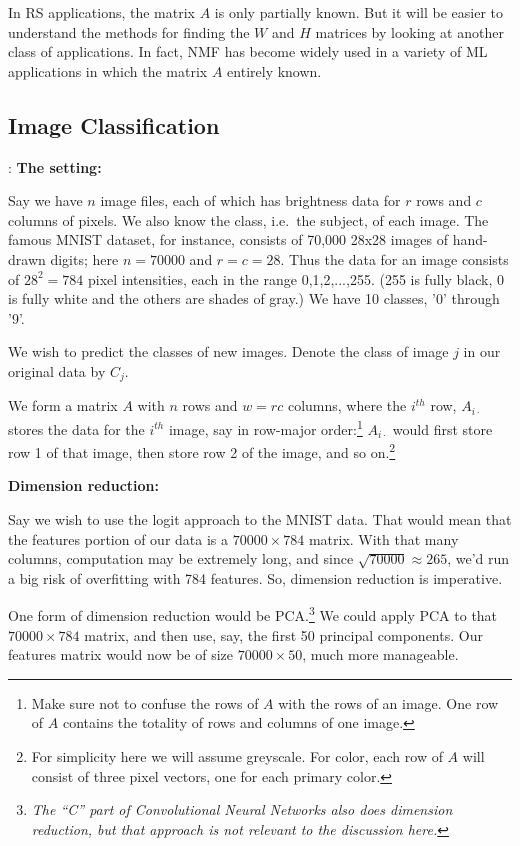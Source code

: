 In RS applications, the matrix $A$ is only partially known.  But it will
be easier to understand the methods for finding the $W$ and $H$ matrices
by looking at another class of applications.  In fact, NMF has become
widely used in a variety of ML applications in which the matrix $A$
entirely known. 

\subsection{Image Classification}
:
\textbf{The setting:}

Say we have $n$ image files, each of which has brightness data for $r$
rows and $c$ columns of pixels.  We also know the class, i.e.\ the
subject, of each image.  The famous MNIST dataset, for instance,
consists of 70,000 28x28 images of hand-drawn digits; here $n = 70000$
and $r = c = 28$.  Thus the data for an image consists of $28^2 = 784$
pixel intensities, each in the range 0,1,2,...,255.  (255 is fully
black, 0 is fully white and the others are shades of gray.) We have 10
classes, '0' through '9'.

We wish to predict the classes of new images. Denote the class of
image $j$ in our original data by $C_j$.

We form a matrix $A$ with $n$ rows and $w = rc$ columns, where the
$i^{th}$ row, $A_{i \cdot}$ stores the data for the $i^{th}$ image, say
in row-major order:\footnote{Make sure not to confuse the rows of $A$
with the rows of an image.  One row of $A$ contains the totality of rows
and columns of one image.} $A_{i \cdot}$ would first store row 1 of
that image, then store row 2 of the image, and so on.\footnote{For
simplicity here we will assume greyscale.  For color, each row of $A$
will consist of three pixel vectors, one for each primary color.}

\textbf{Dimension reduction:}

Say we wish to use the logit approach to the MNIST data.  That would
mean that the features portion of our data is a $70000 \times 784$
matrix.  With that many columns, computation may be extremely long, and
since $\sqrt{70000} \approx 265$, we'd run a big risk of overfitting
with 784 features.  So, dimension reduction is imperative.

One form of dimension reduction would be PCA.\footnote{\textit{The ``C''
part of \textit{Convolutional Neural Networks} also does dimension
reduction, but that approach is not relevant to the discussion here.}}
We could apply PCA to that $70000 \times 784$ matrix, and then use, say,
the first 50 principal components.  Our features matrix would now be of
size $70000 \times 50$, much more manageable.

